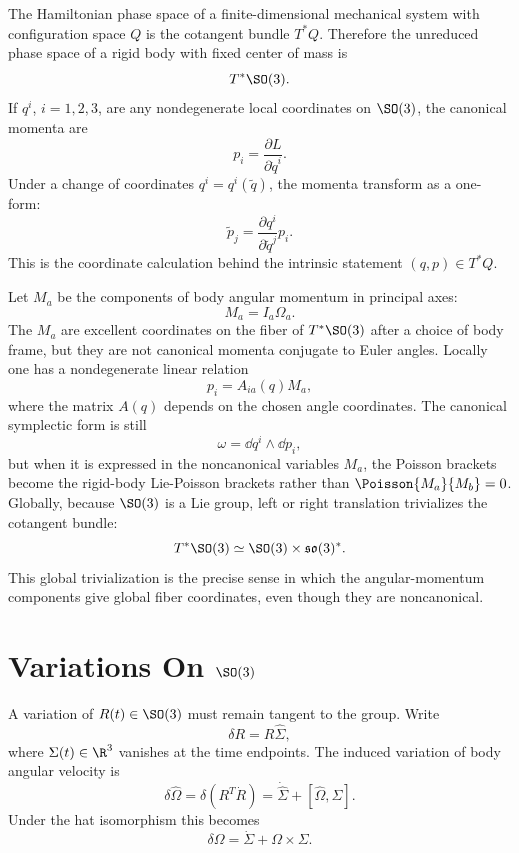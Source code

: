 The Hamiltonian phase space of a finite-dimensional mechanical system with
configuration space \(Q\) is the cotangent bundle \(T^*Q\). Therefore the
unreduced phase space of a rigid body with fixed center of mass is
\[
  T^*\SO(3).
\]
If \(q^i\), \(i=1,2,3\), are any nondegenerate local coordinates on
\(\SO(3)\), the canonical momenta are
\[
  p_i=\frac{\partial L}{\partial \dot q^i}.
\]
Under a change of coordinates \(q^i=q^i(\tilde q)\), the momenta transform as a
one-form:
\[
  \tilde p_j
  =
  \frac{\partial q^i}{\partial \tilde q^j}p_i.
\]
This is the coordinate calculation behind the intrinsic statement
\((q,p)\in T^*Q\).

\begin{remark}
Let \(M_a\) be the components of body angular momentum in principal axes:
\[
  M_a=I_a\Omega_a.
\]
The \(M_a\) are excellent coordinates on the fiber of \(T^*\SO(3)\) after a
choice of body frame, but they are not canonical momenta conjugate to Euler
angles. Locally one has a nondegenerate linear relation
\[
  p_i=A_{ia}(q)M_a,
\]
where the matrix \(A(q)\) depends on the chosen angle coordinates. The canonical
symplectic form is still
\[
  \omega=\dd q^i\wedge \dd p_i,
\]
but when it is expressed in the noncanonical variables \(M_a\), the Poisson
brackets become the rigid-body Lie-Poisson brackets rather than
\(\Poisson{M_a}{M_b}=0\).
Globally, because \(\SO(3)\) is a Lie group, left or right translation
trivializes the cotangent bundle:
\[
  T^*\SO(3)\simeq \SO(3)\times\mathfrak{so}(3)^*.
\]
This global trivialization is the precise sense in which the angular-momentum
components give global fiber coordinates, even though they are noncanonical.
\end{remark}

\section{\texorpdfstring{Variations On \(\SO(3)\)}{Variations On SO(3)}}
\label{sec:variations-so3}

A variation of \(R(t)\in\SO(3)\) must remain tangent to the group. Write
\[
  \delta R=R\widehat\Sigma,
\]
where \(\Sigma(t)\in\R^3\) vanishes at the time endpoints. The induced variation
of body angular velocity is
\[
  \delta\widehat\Omega
  =
  \delta(R^T\dot R)
  =
  \dot{\widehat\Sigma}+[\widehat\Omega,\widehat\Sigma].
\]
Under the hat isomorphism this becomes
\[
  \delta\Omega=\dot\Sigma+\Omega\times\Sigma.
\]

